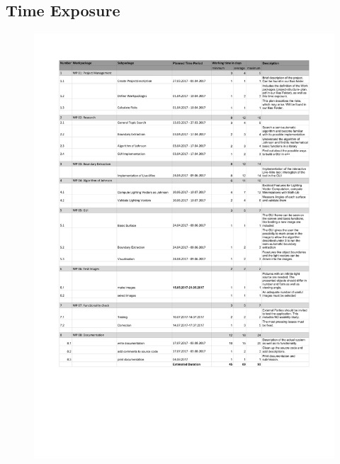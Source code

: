 \subsection{Time Exposure} \label{sec:timeExposure}
\begin{figure}[H] 
	\center 
	\includegraphics[scale = 0.8]{Images/Project Description and Time Exposure.pdf}		
\end{figure}



